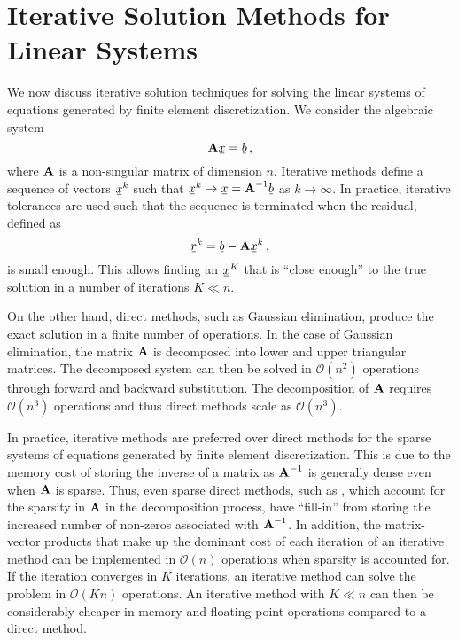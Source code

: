 \documentclass[../doc.tex]{subfiles}
\begin{document}
\section{Iterative Solution Methods for Linear Systems}
We now discuss iterative solution techniques for solving the linear systems of equations generated by finite element discretization. 
We consider the algebraic system 
	\begin{equation}
		\mat{A} \ubar{x} = \ubar{b} \,, 
	\end{equation}
where $\boldsymbol{\mathrm{A}}$ is a non-singular matrix of dimension $n$. Iterative methods define a sequence of vectors $\ubar{x}^k$ such that $\ubar{x}^k \rightarrow \ubar{x} = \mat{A}^{-1} \ubar{b}$ as $k\rightarrow \infty$. In practice, iterative tolerances are used such that the sequence is terminated when the residual, defined as 
	\begin{equation} \label{fem:residual_vec}
		\ubar{r}^k = \ubar{b} - \mat{A}\ubar{x}^k \,,
	\end{equation}
is small enough. This allows finding an $\ubar{x}^K$ that is ``close enough'' to the true solution in a number of iterations $K\ll n$. 

On the other hand, direct methods, such as Gaussian elimination, produce the exact solution in a finite number of operations. In the case of Gaussian elimination, the matrix $\boldsymbol{\mathrm{A}}$ is decomposed into lower and upper triangular matrices. The decomposed system can then be solved in $\mathcal{O}(n^2)$ operations through forward and backward substitution. The decomposition of $\boldsymbol{\mathrm{A}}$ requires $\mathcal{O}(n^3)$ operations and thus direct methods scale as $\mathcal{O}(n^3)$. 

In practice, iterative methods are preferred over direct methods for the sparse systems of equations generated by finite element discretization. This is due to the memory cost of storing the inverse of a matrix as $\boldsymbol{\mathrm{A}}^{-1}$ is generally dense even when $\boldsymbol{\mathrm{A}}$ is sparse. 
Thus, even sparse direct methods, such as \textcite{lidemmel03}, which account for the sparsity in $\boldsymbol{\mathrm{A}}$ in the decomposition process, have ``fill-in'' from storing the increased number of non-zeros associated with $\boldsymbol{\mathrm{A}}^{-1}$. In addition, the matrix-vector products that make up the dominant cost of each iteration of an iterative method can be implemented in $\mathcal{O}(n)$ operations when sparsity is accounted for. If the iteration converges in $K$ iterations, an iterative method can solve the problem in $\mathcal{O}(Kn)$ operations. An iterative method with $K \ll n$ can then be considerably cheaper in memory and floating point operations compared to a direct method. 
\end{document}
